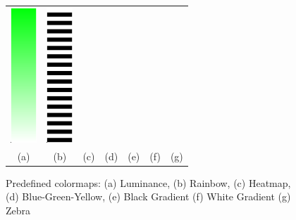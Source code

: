 \begin{figure}[htbp]
\begin{tabular}{ccccccc}
      \includegraphics[height=2in]{figures/colormaps/whiteGradient.png}&
      \includegraphics[height=2in]{figures/colormaps/zebra.png}\\
    (a)&(b)&(c)&(d)&(e)&(f)&(g)\\
    \end{tabular}
    \caption{Predefined colormaps: (a) Luminance, (b) Rainbow, (c) Heatmap, (d)  Blue-Green-Yellow, (e) Black Gradient (f) White Gradient (g) Zebra}
    \label{fig:colormaps}
\end{figure}



